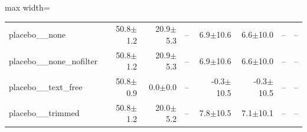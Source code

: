 \begin{table}[t]
{\begin{adjustbox}{max width=\linewidth}
\begin{tabular}{lrrrrrrr}
placebo\_\_none & 50.8$\pm$1.2 & 20.9$\pm$5.3 & -- & 6.9$\pm$10.6 & 6.6$\pm$10.0 & -- & -- \\
placebo\_\_none\_nofilter & 50.8$\pm$1.2 & 20.9$\pm$5.3 & -- & 6.9$\pm$10.6 & 6.6$\pm$10.0 & -- & -- \\
placebo\_\_text\_free & 50.8$\pm$0.9 & 0.0$\pm$0.0 & -- & -0.3$\pm$10.5 & -0.3$\pm$10.5 & -- & -- \\
placebo\_\_trimmed & 50.8$\pm$1.2 & 20.0$\pm$5.2 & -- & 7.8$\pm$10.5 & 7.1$\pm$10.1 & -- & -- \\
\bottomrule
\end{tabular}
\end{adjustbox}
}
\end{table}
